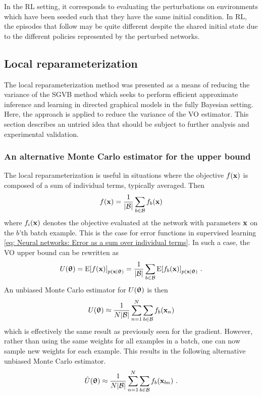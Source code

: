 In the \gls{RL} setting, it corresponds to evaluating the perturbations on environments which have been seeded such that they have the same initial condition. In \gls{RL}, the episodes that follow may be quite different despite the shared initial state due to the different policies represented by the perturbed networks.
 




\subsection{Local reparameterization}\label{sec: Theory: Local reparameterization for variance reduction}
The local reparameterization method \cite{Kingma2015a} was presented as a means of reducing the variance of the \gls{SGVB} method \cite{Kingma2013} which seeks to perform efficient approximate inference and learning in directed graphical models in the fully Bayesian setting. Here, the approach is applied to reduce the variance of the \gls{VO} estimator. This section describes an untried idea that should be subject to further analysis and experimental validation.

\subsubsection{An alternative Monte Carlo estimator for the upper bound}
The local reparameterization is useful in situations where the objective $f({\mathbf{x}})$ is composed of a sum of individual terms, typically averaged. Then
\begin{equation}
    f({\mathbf{x}})=\frac{1}{{\left\lvert\mathcal{B}\right\rvert}}\sum_{b\in\mathcal{B}}f_b({\mathbf{x}})
\end{equation}
where $f_i({\mathbf{x}})$ denotes the objective evaluated at the network with parameters ${\mathbf{x}}$ on the $b$'th batch example. 
This is the case for error functions in supervised learning \eqref{eq: Neural networks: Error as a sum over individual terms}. 
In such a case, the \gls{VO} upper bound can be rewritten as
\begin{equation}
    U({\boldsymbol{\uptheta}}) = \text{E}{\left[f({\mathbf{x}})\right]}_{p({\mathbf{x}}|{\boldsymbol{\uptheta}})} = \frac{1}{{\left\lvert\mathcal{B}\right\rvert}}\sum_{b\in\mathcal{B}}\text{E}{\left[f_b({\mathbf{x}})\right]}_{p({\mathbf{x}}|{\boldsymbol{\uptheta}})} \ .
\end{equation}
An unbiased Monte Carlo estimator for $U({\boldsymbol{\uptheta}})$ is then %
\begin{equation}\label{eq: Theory: Local reparameterization: U estimator, reused weights for each example}
    U({\boldsymbol{\uptheta}}) \approx \frac{1}{N{\left\lvert\mathcal{B}\right\rvert}}\sum_{n=1}^N\sum_{b\in\mathcal{B}}f_b({\mathbf{x}}_n)
\end{equation}
which is effectively the same result as previously seen for the gradient. However, rather than using the same weights for all examples in a batch, one can now sample new weights for each example. This results in the following alternative unbiased Monte Carlo estimator.
\begin{equation}\label{eq: Theory: Local reparameterization: U estimator, new weights for each example}
    \tilde{U}({\boldsymbol{\uptheta}}) \approx \frac{1}{N{\left\lvert\mathcal{B}\right\rvert}}\sum_{n=1}^N\sum_{b\in\mathcal{B}}f_b({\mathbf{x}}_{bn}) \ .
\end{equation}

